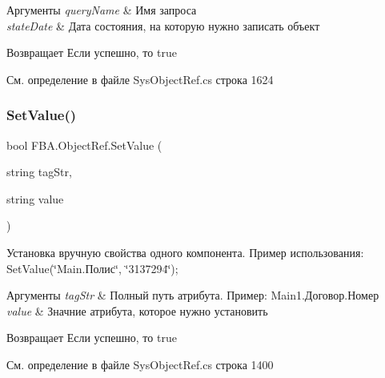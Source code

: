 \begin{DoxyParams}{Аргументы}
{\em query\+Name} & Имя запроса\\
\hline
{\em state\+Date} & Дата состояния, на которую нужно записать объект\\
\hline
\end{DoxyParams}
\begin{DoxyReturn}{Возвращает}
Если успешно, то true
\end{DoxyReturn}


См. определение в файле Sys\+Object\+Ref.\+cs строка 1624

\mbox{\label{class_f_b_a_1_1_object_ref_abb49524b064b9a2a9d899dd8d3dfcc2d}} 
\subsubsection{\texorpdfstring{Set\+Value()}{SetValue()}}
{\footnotesize\ttfamily bool F\+B\+A.\+Object\+Ref.\+Set\+Value (\begin{DoxyParamCaption}\item[{string}]{tag\+Str,  }\item[{string}]{value }\end{DoxyParamCaption})}



Установка вручную свойства одного компонента. Пример использования\+: Set\+Value(\char`\"{}\+Main.\+Полис\char`\"{}, \char`\"{}3137294\char`\"{}); 


\begin{DoxyParams}{Аргументы}
{\em tag\+Str} & Полный путь атрибута. Пример\+: Main1.\+Договор.\+Номер\\
\hline
{\em value} & Значние атрибута, которое нужно установить\\
\hline
\end{DoxyParams}
\begin{DoxyReturn}{Возвращает}
Если успешно, то true
\end{DoxyReturn}


См. определение в файле Sys\+Object\+Ref.\+cs строка 1400

\mbox{\label{class_f_b_a_1_1_object_ref_a9985e9852c812e075a1caccbc7c6d645}} 
